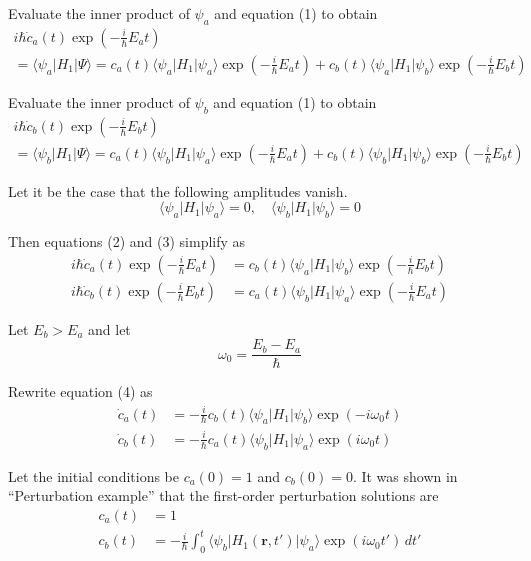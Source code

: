 Evaluate the inner product of $\psi_a$ and equation (1) to obtain
\begin{multline*}
i\hbar\dot c_a(t)\exp\left(-\tfrac{i}{\hbar}E_at\right)
\\
=\langle\psi_a|H_1|\Psi\rangle
=c_a(t)\langle\psi_a|H_1|\psi_a\rangle\exp\left(-\tfrac{i}{\hbar}E_at\right)
+c_b(t)\langle\psi_a|H_1|\psi_b\rangle\exp\left(-\tfrac{i}{\hbar}E_bt\right)
\tag{2}
\end{multline*}

Evaluate the inner product of $\psi_b$ and equation (1) to obtain
\begin{multline*}
i\hbar\dot c_b(t)\exp\left(-\tfrac{i}{\hbar}E_bt\right)
\\
=\langle\psi_b|H_1|\Psi\rangle
=c_a(t)\langle\psi_b|H_1|\psi_a\rangle\exp\left(-\tfrac{i}{\hbar}E_at\right)
+c_b(t)\langle\psi_b|H_1|\psi_b\rangle\exp\left(-\tfrac{i}{\hbar}E_bt\right)
\tag{3}
\end{multline*}

Let it be the case that the following amplitudes vanish.
\begin{equation*}
\langle\psi_a|H_1|\psi_a\rangle=0,\quad \langle\psi_b|H_1|\psi_b\rangle=0
\end{equation*}

Then equations (2) and (3) simplify as
\begin{equation*}
\begin{aligned}
i\hbar\dot c_a(t)\exp\left(-\tfrac{i}{\hbar}E_at\right)
&=c_b(t)\langle\psi_a|H_1|\psi_b\rangle\exp\left(-\tfrac{i}{\hbar}E_bt\right)
\\
i\hbar\dot c_b(t)\exp\left(-\tfrac{i}{\hbar}E_bt\right)
&=c_a(t)\langle\psi_b|H_1|\psi_a\rangle\exp\left(-\tfrac{i}{\hbar}E_at\right)
\end{aligned}
\tag{4}
\end{equation*}

Let $E_b>E_a$ and let
\begin{equation*}
\omega_0=\frac{E_b-E_a}{\hbar}
\end{equation*}

Rewrite equation (4) as
\begin{align*}
\dot c_a(t)&=-\frac{i}{\hbar}c_b(t)\langle\psi_a|H_1|\psi_b\rangle\exp(-i\omega_0t)
\\
\dot c_b(t)&=-\frac{i}{\hbar}c_a(t)\langle\psi_b|H_1|\psi_a\rangle\exp(i\omega_0t)
\end{align*}

Let the initial conditions be $c_a(0)=1$ and $c_b(0)=0$.
It was shown in ``Perturbation example'' that the first-order perturbation solutions are
\begin{align*}
c_a(t)&=1
\\
c_b(t)&=-\frac{i}{\hbar}\int_0^t
\langle\psi_b|H_1(\mathbf r,t')|\psi_a\rangle\exp(i\omega_0t')\,dt'
\end{align*}


